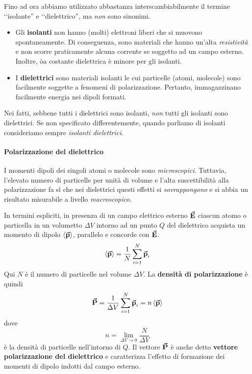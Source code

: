 Fino ad ora abbiamo utilizzato abbastanza interscambiabilmente il termine ‘‘isolante'' e ‘‘dielettrico'', ma \textit{non} sono sinonimi.
\begin{itemize}
	\item Gli \textbf{isolanti} non hanno (molti) elettroni liberi che si muovono spontaneamente. Di conseguenza, sono materiali che hanno un'alta \textit{resistività} e non scorre praticamente alcuna corrente se soggetto ad un campo esterno. Inoltre, òa costante dielettrica è minore per gli isolanti.
	\item I \textbf{dielettrici} sono materiali isolanti le cui particelle (atomi, molecole) sono facilmente soggette a fenomeni di polarizzazione. Pertanto, immagazzinano facilmente energia nei dipoli formati.
\end{itemize}
Nei fatti, sebbene tutti i dielettrici sono isolanti, \textit{non} tutti gli isolanti sono dielettrici. Se non specificato differentemente, quando parliamo di isolanti consideriamo sempre \textit{isolanti dielettrici}.
\paragraph{Polarizzazione del dielettrico}
I momenti dipoli dei singoli atomi o molecole sono \textit{microscopici}. Tuttavia, l'elevato numero di particelle per unità di volume e l'alta suscettibilità alla polarizzazione fa sì che nei dielettrici questi effetti si \textit{sovrappongono} e si abbia un risultato misurabile a livello \textit{macroscopico}.

In termini espliciti, in presenza di un campo elettrico esterno $\vb*{\va{E}}$ ciascun atomo o particella in un volumetto $\Delta V$ intorno ad un punto $Q$ del dielettrico acquista un momento di dipolo $\left<\vb*{\va{p}}\right>$, parallelo e concorde con $\vb*{\va{E}}$.
\begin{equation*}
	\left<\vb*{\va{p}}\right>=\frac{1}{N}\sum_{i=1}^N\vb*{\va{p}}_i
\end{equation*}
Qui $N$ è il numero di particelle nel volume $\Delta V$. La \textbf{densità di polarizzazione} è quindi
\begin{equation}
	\vb*{\va{P}}=\frac{1}{\Delta V}\sum_{i=1}^{N}\vb*{\va{p}}_i=n\left<\vb*{\va{p}}\right>
\end{equation}
dove
\begin{equation*}
	n=\lim_{\Delta V\to 0}\frac{N}{\Delta V}
\end{equation*}
è la densità di particelle nell'intorno di $Q$. Il vettore $\vb*{\va{P}}$ è anche detto \textbf{vettore polarizzazione del dielettrico} e caratterizza l'effetto di formazione dei momenti di dipolo indotti dal campo esterno.

